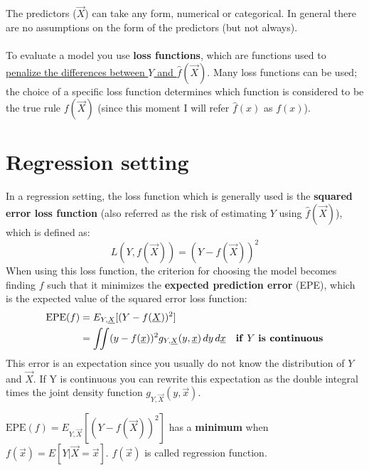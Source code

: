     The predictors ($\vec{X}$) can take any form, numerical or categorical. In
    general there are no assumptions on the form of the predictors (but not
    always).
    \\\\
    To evaluate a model you use \textbf{loss functions}, which are functions
    used to \underline{penalize the differences between $Y$ and
    $\hat{f}(\vec{X})$}. Many loss functions can be used; the choice of a
    specific loss function determines which function is considered to be the
    true rule $f(\vec{X})$ (since this moment I will refer $\hat{f}(x)$ as
    $f(x)$).

  \section{Regression setting}
    In a regression setting, the loss function which is generally used is the
    \textbf{squared error loss function} (also referred as the risk of
    estimating $ Y $ using $ \hat{f}(\vec{X}) $), which is defined as:
    $$L(Y,f(\vec{X})) = (Y-f(\vec{X}))^2$$ When using this loss function, the
    criterion for choosing the model becomes finding $f$ such that it minimizes
    the \textbf{expected prediction error} (EPE), which is the expected value of
    the squared error loss function:
    \begin{align*}
      \text{EPE}(f) & = E_{Y,\vec{X}}[(Y-f(\vec{X}))^2] \\
                    & = \iint (y - f(\vec{x}))^2 g_{Y,\vec{X}}(y, \vec{x})\,dy\,d\vec{x} & \text{\textbf{if} } Y \text{ \textbf{is continuous}}
    \end{align*}
    This error is an expectation since you usually do not know the distribution
    of $Y$ and $\vec{X}$. If Y is continuous you can rewrite this expectation as
    the double integral times the joint density function $g_{Y,\vec{X}}(y, \vec{x})$.\\
    
    \begin{theorem}
      $\text{EPE}(f) = E_{Y,\vec{X}}[(Y-f(\vec{X}))^2]$ has a \textbf{minimum}
      when $f(\vec{x}) = E[Y|\vec{X} = \vec{x}]$. $f(\vec{x})$ is called
      regression function.
    \end{theorem}

